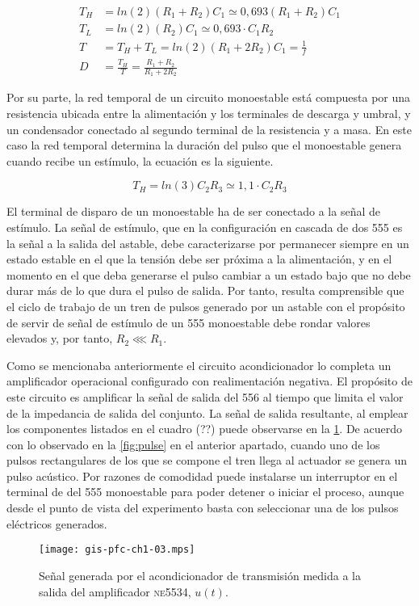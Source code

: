 \begin{align}
	T_H &= ln(2)(R_1 + R_2)C_1 \simeq 0,693(R_1 + R_2)C_1 \\
	T_L &= ln(2)(R_2)C_1 \simeq 0,693\cdot C_1R_2 \\
	T &= T_H + T_L = ln(2)(R_1 + 2R_2)C_1 = \frac{1}{f} \\
	D &= \frac{T_H}{T} = \frac{R_1 + R_2}{R_1 + 2R_2}
	\label{eq:astable}
\end{align}

Por su parte, la red temporal de un circuito monoestable está compuesta por
una resistencia ubicada entre la alimentación y los terminales de descarga
y umbral, y un condensador conectado al segundo terminal de la resistencia
y a masa. En este caso la red temporal determina la duración del pulso que
el monoestable genera cuando recibe un estímulo, la ecuación es la
siguiente.

\begin{equation}
	T_H = ln(3)C_2R_3 \simeq 1,1\cdot C_2R_3
	\label{eq:monostable}
\end{equation}

El terminal de disparo de un monoestable ha de ser conectado a la señal de
estímulo. La señal de estímulo, que en la configuración en cascada de dos
555 es la señal a la salida del astable, debe caracterizarse por permanecer
siempre en un estado estable en el que la tensión debe ser próxima a la
alimentación, y en el momento en el que deba generarse el pulso cambiar a
un estado bajo que no debe durar más de lo que dura el pulso de salida. Por
tanto, resulta comprensible que el ciclo de trabajo de un tren de pulsos
generado por un astable con el propósito de servir de señal de estímulo de
un 555 monoestable debe rondar valores elevados y, por tanto, $R_2 \lll
R_1$.

Como se mencionaba anteriormente el circuito acondicionador lo completa un
amplificador operacional configurado con realimentación negativa. El
propósito de este circuito es amplificar la señal de salida del 556 al
tiempo que limita el valor de la impedancia de salida del conjunto. La
señal de salida resultante, al emplear los componentes listados en el
cuadro (??) puede observarse en la \cref{fig:txacvo}. De acuerdo con lo
observado en la \cref{fig:pulse} en el anterior apartado, cuando uno de los
pulsos rectangulares de los que se compone el tren llega al actuador se
genera un pulso acústico. Por razones de comodidad puede instalarse un
interruptor en el terminal de  del 555 monoestable para poder
detener o iniciar el proceso, aunque desde el punto de vista del
experimento basta con seleccionar una de los pulsos eléctricos generados.

\begin{figure}
	\begin{center}
		\texttt{[image: gis-pfc-ch1-03.mps]}
	\end{center}
	\caption[Señal a la salida del amplificador \textsc{ne5534},
	$u(t)$]{Señal generada por el acondicionador de transmisión medida
	a la salida del amplificador \textsc{ne5534}, $u(t)$.}
	\label{fig:txacvo}
\end{figure}
